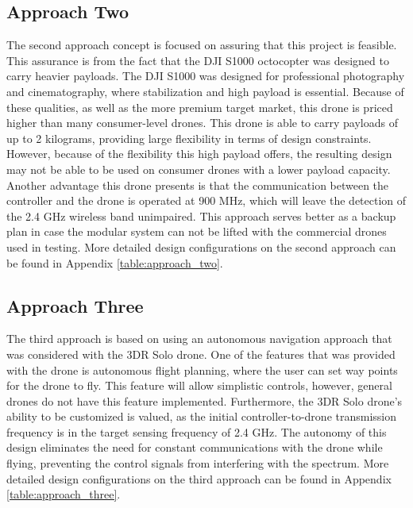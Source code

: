 \subsection{Approach Two}
The second approach concept is focused on assuring that this project is feasible. This assurance is from the fact that the DJI S1000 octocopter was designed to carry heavier payloads. The DJI S1000 was designed for professional photography and cinematography, where stabilization and high payload is essential. Because of these qualities, as well as the more premium target market, this drone is priced higher than many consumer-level drones. This drone is able to carry payloads of up to 2 kilograms, providing large flexibility in terms of design constraints. However, because of the flexibility this high payload offers, the resulting design may not be able to be used on consumer drones with a lower payload capacity. Another advantage this drone presents is that the communication between the controller and the drone is operated at 900 MHz, which will leave the detection of the 2.4 GHz wireless band unimpaired. This approach serves better as a backup plan in case the modular system can not be lifted with the commercial drones used in testing. More detailed design configurations on the second approach can be found in Appendix \ref{table:approach_two}.

\subsection{Approach Three}
The third approach is based on using an autonomous navigation approach that was considered with the 3DR Solo drone. One of the features that was provided with the drone is autonomous flight planning, where the user can set way points for the drone to fly. This feature will allow simplistic controls, however, general drones do not have this feature implemented. Furthermore, the 3DR Solo drone’s ability to be customized is valued, as the initial controller-to-drone transmission frequency is in the target sensing frequency of 2.4 GHz. The autonomy of this design eliminates the need for constant communications with the drone while flying, preventing the control signals from interfering with the spectrum. More detailed design configurations on the third approach can be found in Appendix \ref{table:approach_three}.

